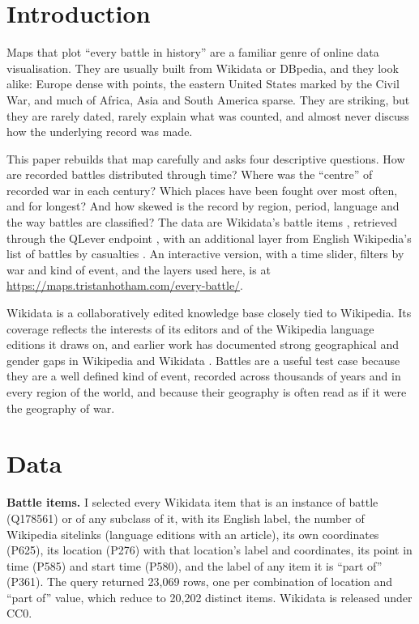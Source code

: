 \documentclass[11pt,a4paper]{article}
\begin{document}
\section{Introduction}
Maps that plot ``every battle in history'' are a familiar genre of online data visualisation. They are usually built from Wikidata or DBpedia, and they look alike: Europe dense with points, the eastern United States marked by the Civil War, and much of Africa, Asia and South America sparse. They are striking, but they are rarely dated, rarely explain what was counted, and almost never discuss how the underlying record was made.

This paper rebuilds that map carefully and asks four descriptive questions. How are recorded battles distributed through time? Where was the ``centre'' of recorded war in each century? Which places have been fought over most often, and for longest? And how skewed is the record by region, period, language and the way battles are classified? The data are Wikidata's battle items \citep{wikidata}, retrieved through the QLever endpoint \citep{qlever}, with an additional layer from English Wikipedia's list of battles by casualties \citep{wp_cas}. An interactive version, with a time slider, filters by war and kind of event, and the layers used here, is at \url{https://maps.tristanhotham.com/every-battle/}.

Wikidata is a collaboratively edited knowledge base closely tied to Wikipedia. Its coverage reflects the interests of its editors and of the Wikipedia language editions it draws on, and earlier work has documented strong geographical and gender gaps in Wikipedia and Wikidata \citep{graham,redi}. Battles are a useful test case because they are a well defined kind of event, recorded across thousands of years and in every region of the world, and because their geography is often read as if it were the geography of war.

\section{Data}
\textbf{Battle items.} I selected every Wikidata item that is an instance of battle (Q178561) or of any subclass of it, with its English label, the number of Wikipedia sitelinks (language editions with an article), its own coordinates (P625), its location (P276) with that location's label and coordinates, its point in time (P585) and start time (P580), and the label of any item it is ``part of'' (P361). The query returned 23,069 rows, one per combination of location and ``part of'' value, which reduce to 20,202 distinct items. Wikidata is released under CC0.
\end{document}
